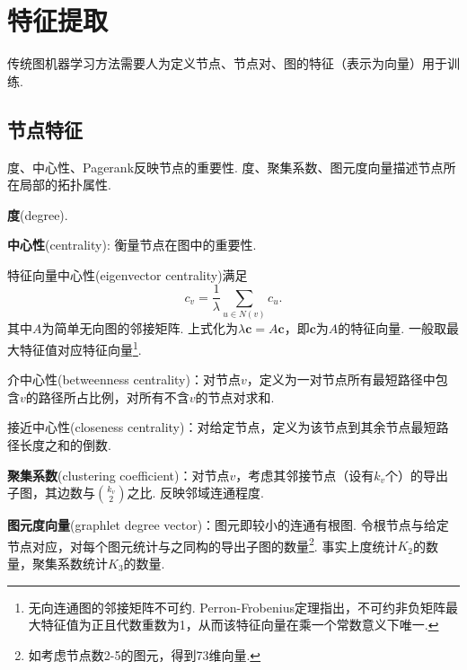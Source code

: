 \section{特征提取}

\par 传统图机器学习方法需要人为定义节点、节点对、图的特征（表示为向量）用于训练. 

\subsection{节点特征}

度、中心性、Pagerank反映节点的重要性. 度、聚集系数、图元度向量描述节点所在局部的拓扑属性. 

\par \textbf{度}(degree).

\par \textbf{中心性}(centrality): 衡量节点在图中的重要性. 
\par 特征向量中心性(eigenvector centrality)满足
\begin{equation}
    c_v=\frac{1}{\lambda}\sum_{u\in N(v)} c_u.
\end{equation}
其中$A$为简单无向图的邻接矩阵. 上式化为$\lambda \mathbf{c}=A\mathbf{c}$，即$\mathbf{c}$为$A$的特征向量. 一般取最大特征值对应特征向量\footnote{无向连通图的邻接矩阵不可约. Perron-Frobenius定理指出，不可约非负矩阵最大特征值为正且代数重数为1，从而该特征向量在乘一个常数意义下唯一. }. 
\par 介中心性(betweenness centrality)：对节点$v$，定义为一对节点所有最短路径中包含$v$的路径所占比例，对所有不含$v$的节点对求和. 
\par 接近中心性(closeness centrality)：对给定节点，定义为该节点到其余节点最短路径长度之和的倒数. 

\par \textbf{聚集系数}(clustering coefficient)：对节点$v$，考虑其邻接节点（设有$k_v$个）的导出子图，其边数与$\binom{k_v}{2}$之比. 反映邻域连通程度. 

\par \textbf{图元度向量}(graphlet degree vector)：图元即较小的连通有根图. 令根节点与给定节点对应，对每个图元统计与之同构的导出子图的数量\footnote{如考虑节点数2-5的图元，得到73维向量. }. 事实上度统计$K_2$的数量，聚集系数统计$K_3$的数量. 

